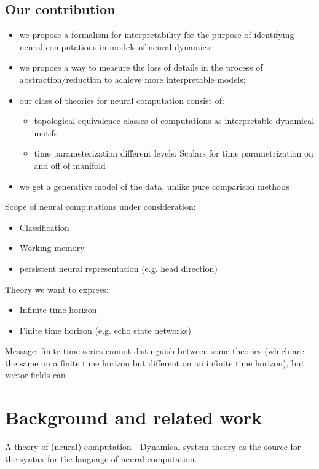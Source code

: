 \documentclass{article}
\theoremstyle{definition} \newtheorem{definition}{Definition}  \newtheorem{example}{Example}
\theoremstyle{remark} \newtheorem{remark}{Remark}
\newcounter{ct}
\begin{document}
\subsection{Our contribution}\label{sec:contribution}
\begin{itemize}
\item we propose a formalism for interpretability for the purpose of identifying neural computations in models of neural dynamics;
\item we propose a way to measure the loss of details in the process of abstraction/reduction to achieve more interpretable models;
\item our class of theories for neural computation consist of:
	\begin{itemize}
\item topological equivalence classes of computations as interpretable dynamical motifs
\item time parameterization different levels:
Scalars for time parametrization on and off of manifold 
\end{itemize}
\item we get a generative model of the data, unlike pure comparison methods
\end{itemize}


Scope of neural computations under consideration:
\begin{itemize}
\item Classification
\item Working memory
\item persistent neural representation (e.g. head direction) %
\end{itemize}

Theory we want to express:
\begin{itemize}
\item Infinite time horizon
\item Finite time horizon (e.g. echo state networks)
\end{itemize}

Message: finite time series cannot distinguish between some theories (which are the same on a finite time horizon but different on an infinite time horizon), but vector fields can

\section{Background and related work}\label{sec:background}
A theory of (neural) computation\citep{jaeger2021theory, jaeger2023timescales, jaeger2023theory}
- Dynamical system theory as the source for the syntax for the language of neural computation.
\citep{elgazzar2024universal}
\end{document}
